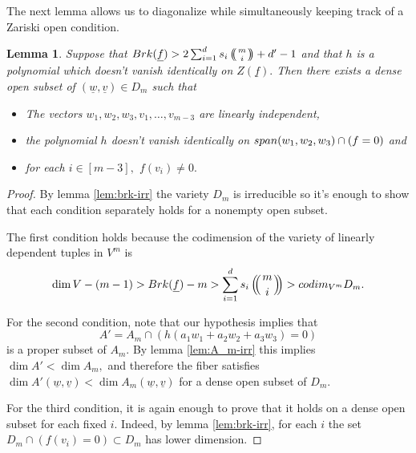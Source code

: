 \documentclass[10pt,a4paper]{amsart}
\let\ul\underline
\newtheorem{lemma}[theorem]{Lemma}
\theoremstyle{definition}
\def\multiset#1#2{\ensuremath{\left(\kern-.3em\left(\genfrac{}{}{0pt}{}{#1}{#2}\right)\kern-.3em\right)}}
\renewcommand{\sp}{\textnormal{span}}
\newcommand{\codim}{\textnormal{codim}}
\newcommand{\brk}{\textnormal{Brk}}
\begin{document}
    The next lemma allows us to diagonalize while simultaneously keeping track of a Zariski open condition.

    \begin{lemma}
        Suppose that $\brk(\ul{f}) > 2\sum_{i=1}^d s_i \multiset{m}{i}+d'-1$ and that $h$ is a polynomial which doesn't vanish identically on $Z(\ul{f}).$ Then there exists a dense open subset of $(\ul{w},\ul{v})\in D_m$ such that 
        \begin{itemize}
        \item The vectors $w_1,w_2,w_3,v_1,\ldots,v_{m-3}$ are linearly independent,
        \item the polynomial $h$ doesn't vanish identically on $\sp(w_1,w_2,w_3)\cap (f=0)$ and 
        \item for each $i\in [m-3],$ $f(v_i) \neq 0.$ 
        \end{itemize}
    \end{lemma}

    \begin{proof}
         By lemma \ref{lem:brk-irr} the variety $D_m$ is irreducible so it's enough to show that each condition separately holds for a nonempty open subset.
         
         The first condition holds because the codimension of the variety of linearly dependent tuples in $V^m$ is
        \[
        \dim V - (m-1) > \brk(\ul{f}) - m > \sum_{i=1}^d s_i \multiset{m}{i} > \codim_{V^m} D_m. 
        \]
      
      For the second condition, note that our hypothesis implies that 
      $$A' = A_m \cap (h(a_1w_1+a_2w_2+a_3w_3) = 0)$$ is a proper subset of $A_m.$ By lemma \ref{lem:A_m-irr} this implies $\dim A' < \dim A_m,$  and therefore the fiber satisfies  $\dim A'(\ul{w},\ul{v}) < \dim A_m(\ul{w},\ul{v})$ for a dense open subset of $D_m.$ 
      
    For the third condition, it is again enough to prove that it holds on a dense open subset for each fixed $i.$ Indeed, by lemma \ref{lem:brk-irr}, for each $i$ the set $D_m\cap (f(v_i) =0) \subset D_m$ has lower dimension.
    \end{proof}
\end{document}

